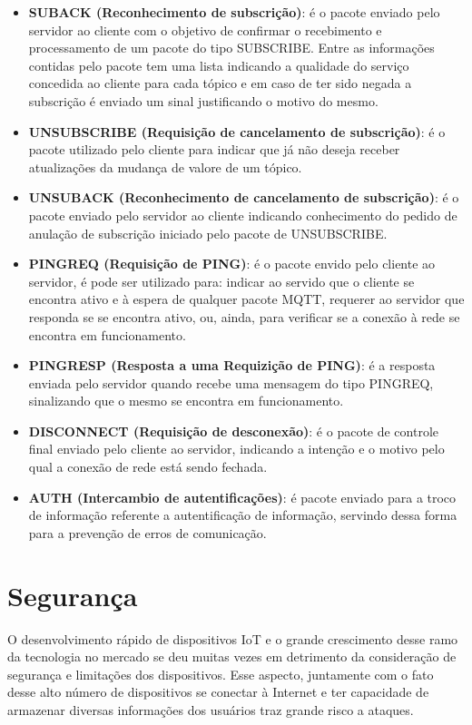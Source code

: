 \documentclass[12pt, a4paper]{article}
\begin{document}
\begin{itemize}
    \item \textbf{SUBACK (Reconhecimento de subscrição)}: é o pacote enviado pelo servidor ao cliente com o objetivo de confirmar o recebimento e processamento de um pacote do tipo SUBSCRIBE. Entre as informações contidas pelo pacote tem uma lista indicando a qualidade do serviço concedida ao cliente para cada tópico e em caso de ter sido negada a subscrição é enviado um sinal justificando o motivo do mesmo.
    \item \textbf{UNSUBSCRIBE (Requisição de cancelamento de subscrição)}: é o pacote utilizado pelo cliente para indicar que já não deseja receber atualizações da mudança de valore de um tópico.
    \item \textbf{UNSUBACK (Reconhecimento de cancelamento de subscrição)}: é o pacote enviado pelo servidor ao cliente indicando conhecimento do pedido de anulação de subscrição iniciado pelo pacote de UNSUBSCRIBE.
    \item \textbf{PINGREQ (Requisição de PING)}: é o pacote envido pelo cliente ao servidor, é pode ser utilizado para: indicar ao servido que o cliente se encontra ativo e à espera de qualquer pacote MQTT, requerer ao servidor que responda se se encontra ativo, ou, ainda, para verificar se a conexão à rede se encontra em funcionamento.
    \item \textbf{PINGRESP (Resposta a uma Requizição de PING)}: é a resposta enviada pelo servidor quando recebe uma mensagem do tipo PINGREQ, sinalizando que o mesmo se encontra em funcionamento.
    \item \textbf{DISCONNECT (Requisição de desconexão)}: é o pacote de controle final enviado pelo cliente ao servidor, indicando a intenção e o motivo pelo qual a conexão de rede está sendo fechada.
    \item \textbf{AUTH (Intercambio de autentificações)}: é pacote enviado para a troco de informação referente a autentificação de informação, servindo dessa forma para a prevenção de erros de comunicação.
\end{itemize}

\cleardoublepage

\section{Segurança}
    O desenvolvimento rápido de dispositivos IoT e o grande crescimento desse ramo da tecnologia no mercado se deu muitas vezes em detrimento da consideração de segurança e limitações dos dispositivos. Esse aspecto, juntamente com o fato desse alto número de dispositivos se conectar à Internet e ter capacidade de armazenar diversas informações dos usuários traz grande risco a ataques. 
    \cite{MQTT_Vunerabilities}
    
\end{document}
